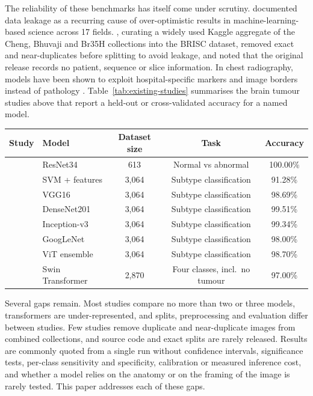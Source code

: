 \documentclass[a4paper,fleqn]{cas-sc}
\begin{document}
The reliability of these benchmarks has itself come under scrutiny. \citet{kapoor2023} documented data leakage as a recurring cause of over-optimistic results in machine-learning-based science across 17 fields. \citet{fateh2026}, curating a widely used Kaggle aggregate of the Cheng, Bhuvaji and Br35H collections into the BRISC dataset, removed exact and near-duplicates before splitting to avoid leakage, and noted that the original release records no patient, sequence or slice information. In chest radiography, models have been shown to exploit hospital-specific markers and image borders instead of pathology \citep{zech2018,degrave2021}. Table~\ref{tab:existing-studies} summarises the brain tumour studies above that report a held-out or cross-validated accuracy for a named model.

\begin{heretable}
\centering
\caption{Accuracies reported by existing brain tumour MRI studies. Subtype classification is the three-way glioma, meningioma and pituitary task, and the 3,064 images are the collection of \citet{cheng2015}.}
\label{tab:existing-studies}
\small
\begin{tabular*}{\textwidth}{@{\extracolsep{\fill}}llccc@{}}
\toprule
Study & Model & Dataset size & Task & Accuracy \\
\midrule
\citet{talo2019} & ResNet34 & 613 & Normal vs abnormal & 100.00\% \\
\citet{cheng2015} & SVM + features & 3,064 & Subtype classification & 91.28\% \\
\citet{rehman2020} & VGG16 & 3,064 & Subtype classification & 98.69\% \\
\citet{noreen2020} & DenseNet201 & 3,064 & Subtype classification & 99.51\% \\
\citet{noreen2020} & Inception-v3 & 3,064 & Subtype classification & 99.34\% \\
\citet{deepak2019} & GoogLeNet & 3,064 & Subtype classification & 98.00\% \\
\citet{tummala2022} & ViT ensemble & 3,064 & Subtype classification & 98.70\% \\
\citet{asiri2024} & Swin Transformer & 2,870 & Four classes, incl.\ no tumour & 97.00\% \\
\bottomrule
\end{tabular*}
\end{heretable}

Several gaps remain. Most studies compare no more than two or three models, transformers are under-represented, and splits, preprocessing and evaluation differ between studies. Few studies remove duplicate and near-duplicate images from combined collections, and source code and exact splits are rarely released. Results are commonly quoted from a single run without confidence intervals, significance tests, per-class sensitivity and specificity, calibration or measured inference cost, and whether a model relies on the anatomy or on the framing of the image is rarely tested. This paper addresses each of these gaps.
\end{document}

